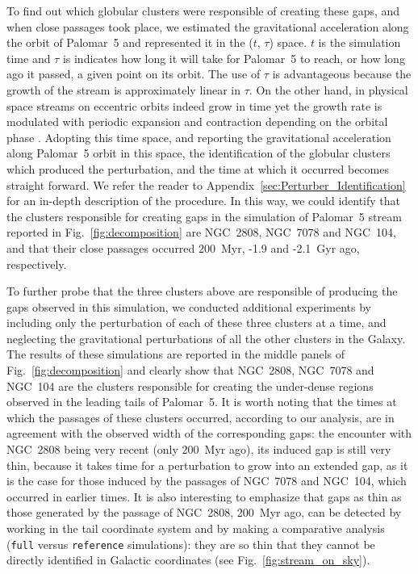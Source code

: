 \documentclass{aa}
\begin{document}
    To find out which globular clusters were responsible of creating these gaps, and when close passages took place, we estimated the gravitational acceleration along the orbit of Palomar~5 and represented it in the ($t$, $\tau$) space. $t$ is the simulation time and $\tau$ is indicates how long it will take for Palomar~5 to reach, or how  long ago it passed, a given point on its orbit. The use of $\tau$ is advantageous because the growth of the stream is approximately linear in $\tau$. On the other hand, in physical space streams on eccentric orbits indeed grow in time yet the growth rate is modulated with periodic expansion and contraction depending on the orbital phase \citep[see the top panel of Fig.~5.][for an example]{2016MNRAS.457.3817S}. Adopting this time space, and reporting the gravitational acceleration along Palomar~5 orbit in this space, the identification of the globular clusters which produced the perturbation, and the time at which it occurred becomes straight forward. We refer the reader to Appendix~\ref{sec:Perturber_Identification} for an in-depth description of the procedure. In this way, we could identify that the clusters responsible for creating gaps in the simulation of Palomar~5 stream reported in Fig.~\ref{fig:decomposition} are NGC~2808, NGC~7078 and NGC~104, and that their close passages occurred 200~Myr, -1.9 and -2.1~Gyr ago, respectively. 
    
    To further probe that the three clusters above are responsible of producing the gaps observed in this simulation, we conducted additional experiments by including only the perturbation of each of these three clusters at a time, and neglecting the gravitational perturbations of all the other clusters in the Galaxy. The results of these simulations are reported in the middle panels of Fig.~\ref{fig:decomposition} and clearly show that NGC~2808, NGC~7078 and NGC~104 are the clusters responsible for creating the under-dense regions observed in the leading tails of Palomar~5. It is worth noting that the times at which the passages of these clusters occurred, according to our analysis, are in agreement with the observed width of the corresponding gaps: the encounter with NGC~2808 being very recent (only 200~Myr ago), its induced gap is still very thin, because it takes time for a perturbation to grow into an extended gap, as it is the case for those induced by the passages of  NGC~7078 and NGC~104, which occurred in earlier times. It is also interesting to emphasize that gaps as thin as those generated by the passage of NGC~2808, 200~Myr ago, can be detected by working in the tail coordinate system and by making a comparative analysis (\texttt{full} versus \texttt{reference} simulations): they are so thin that they cannot be directly identified in Galactic coordinates (see Fig.~\ref{fig:stream_on_sky}).\\
\end{document}
